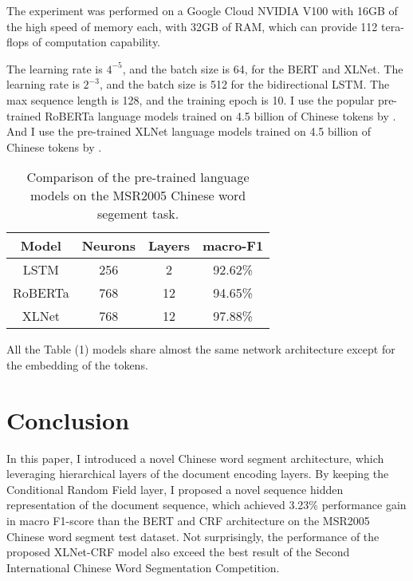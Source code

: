 \documentclass[11pt,a4paper]{article}
\begin{document}
The experiment was performed on a Google Cloud NVIDIA V100 with 16GB of the high speed of memory each, with 32GB of RAM,
which can provide 112 tera-flops of computation capability.

The learning rate is $4^{-5}$, and the batch size is 64, for the BERT and XLNet.
The learning rate is $2^{-3}$, and the batch size is 512 for the bidirectional LSTM.
The max sequence length is 128, and the training epoch is 10.
I use the popular pre-trained RoBERTa language models trained on 4.5 billion of Chinese tokens by \citet{cui2020revisiting}.
And I use the pre-trained XLNet language models trained on 4.5 billion of Chinese tokens by \citet{cui2020revisiting}.

\begin{table}
\centering
\begin{tabular}{cccc}
\hline
\textbf{Model} & \textbf{Neurons}& \textbf{Layers} & \textbf{macro-F1} \\
\hline
LSTM & 256 & 2 & 92.62\% \\
RoBERTa & 768 & 12 & 94.65\% \\
XLNet & 768 & 12 & 97.88\% \\
\hline
\end{tabular}
\caption{Comparison of the pre-trained language models on the MSR2005 Chinese word segement task.}
\end{table}


All the Table (1) models share almost the same network architecture except for the embedding of the tokens.


\section{Conclusion}

In this paper, I introduced a novel Chinese word segment architecture, which leveraging hierarchical layers of the document encoding layers.
By keeping the Conditional Random Field layer, I proposed a novel sequence hidden representation of the document sequence, which achieved 3.23\% performance gain in macro F1-score than
the BERT and CRF architecture on the MSR2005 Chinese word segment test dataset.
Not surprisingly, the performance of the proposed XLNet-CRF model also exceed the best result of the Second International Chinese Word Segmentation Competition.





\end{document}
